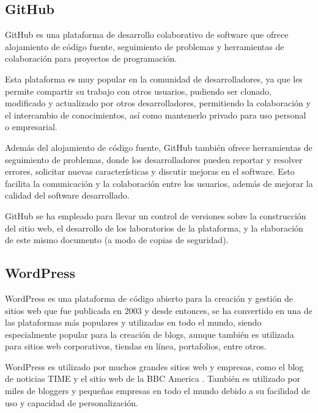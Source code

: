         \subsection{GitHub}
        
            GitHub es una plataforma de desarrollo colaborativo de software que ofrece alojamiento de código fuente, seguimiento de problemas y herramientas de colaboración para proyectos de programación.
            
            Esta plataforma es muy popular en la comunidad de desarrolladores, ya que les permite compartir su trabajo con otros usuarios, pudiendo ser clonado, modificado y actualizado por otros desarrolladores, permitiendo la colaboración y el intercambio de conocimientos, así como mantenerlo privado para uso personal o empresarial.
            
            Además del alojamiento de código fuente, GitHub también ofrece herramientas de seguimiento de problemas, donde los desarrolladores pueden reportar y resolver errores, solicitar nuevas características y discutir mejoras en el software. Esto facilita la comunicación y la colaboración entre los usuarios, además de mejorar la calidad del software desarrollado.

            GitHub se ha empleado para llevar un control de versiones sobre la construcción del sitio web, el desarrollo de los laboratorios de la plataforma, y la elaboración de este mismo documento (a modo de copias de seguridad).
            
        \subsection{WordPress}
            
            WordPress \cite{wordpress} es una plataforma de código abierto para la creación y gestión de sitios web que fue publicada en 2003 y desde entonces, se ha convertido en una de las plataformas más populares y utilizadas en todo el mundo, siendo especialmente popular para la creación de blogs, aunque también es utilizada para sitios web corporativos, tiendas en línea, portafolios, entre otros. 
            
            WordPress es utilizado por muchos grandes sitios web y empresas, como el blog de noticias TIME \cite{time-web} y el sitio web de la BBC America \cite{bbc-america-web}. También es utilizado por miles de bloggers y pequeñas empresas en todo el mundo debido a su facilidad de uso y capacidad de personalización.

